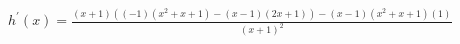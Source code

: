 $ \displaystyle h^{\prime}(x) = \frac{(x + 1)\left((- 1)(x^2 + x + 1) - (x-1)(2x+1)\right)- (x - 1)(x^2 + x + 1)(1)}{(x + 1)^2} $